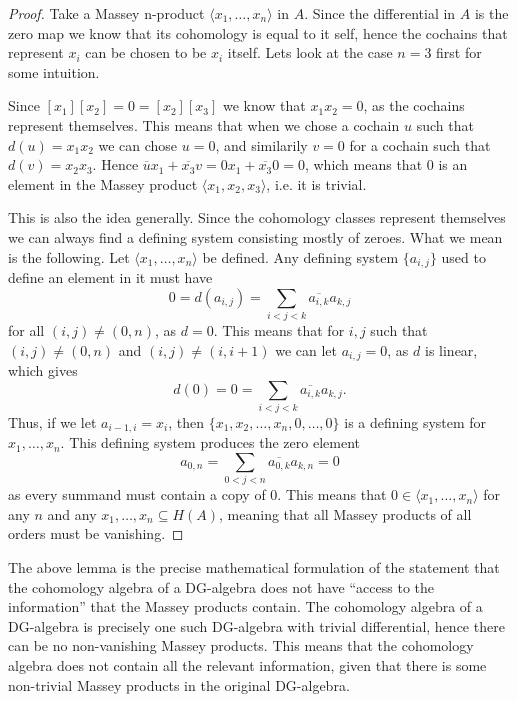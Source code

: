 \begin{proof}
Take a Massey n-product $\langle x_1, \ldots, x_n\rangle$ in $A$. Since the differential in $A$ is the zero map we know that its cohomology is equal to it self, hence the cochains that represent $x_i$ can be chosen to be $x_i$ itself. Lets look at the case $n=3$ first for some intuition. 

Since $[x_1][x_2]=0=[x_2][x_3]$ we know that $x_1 x_2 =0$, as the cochains represent themselves. This means that when we chose a cochain $u$ such that $d(u)=x_1 x_2$ we can chose $u=0$, and similarily $v=0$ for a cochain such that $d(v)=x_2 x_3$. Hence $\overline{u}x_1+\overline{x_3}v = 0x_1+\overline{x_3}0=0$, which means that $0$ is an element in the Massey product $\langle x_1, x_2, x_3\rangle$, i.e. it is trivial. 

This is also the idea generally. Since the cohomology classes represent themselves we can always find a defining system consisting mostly of zeroes. What we mean is the following. Let $\langle x_1, \ldots, x_n\rangle$ be defined. Any defining system $\{a_{i,j}\}$ used to define an element in it must have 
\begin{equation*}
    0 = d(a_{i,j}) = \sum_{i<j<k}\overline{a_{i,k}} a_{k,j}
\end{equation*}
for all $(i,j)\neq (0,n)$, as $d=0$. This means that for $i,j$ such that $(i,j)\neq (0,n)$ and $(i,j)\neq (i,i+1)$ we can let $a_{i,j} = 0$, as $d$ is linear, which gives
\begin{equation*}
    d(0)=0=\sum_{i<j<k}\overline{a_{i,k}} a_{k,j}.
\end{equation*}
Thus, if we let $a_{i-1, i} = x_i$, then $\{ x_1, x_2,\ldots, x_n, 0, \ldots, 0 \}$ is a defining system for $x_1, \ldots, x_n$. This defining system produces the zero element
\begin{equation*}
    a_{0,n} = \sum_{0<j<n}\overline{a_{0,k}} a_{k,n} = 0
\end{equation*}
as every summand must contain a copy of 0. This means that $0\in \langle x_1, \ldots, x_n\rangle$ for any $n$ and any $x_1, \ldots, x_n \subseteq H(A)$, meaning that all Massey products of all orders must be vanishing.
\end{proof}

The above lemma is the precise mathematical formulation of the statement that the cohomology algebra of a DG-algebra does not have ``access to the information'' that the Massey products contain. The cohomology algebra of a DG-algebra is precisely one such DG-algebra with trivial differential, hence there can be no non-vanishing Massey products. This means that the cohomology algebra does not contain all the relevant information, given that there is some non-trivial Massey products in the original DG-algebra. 

